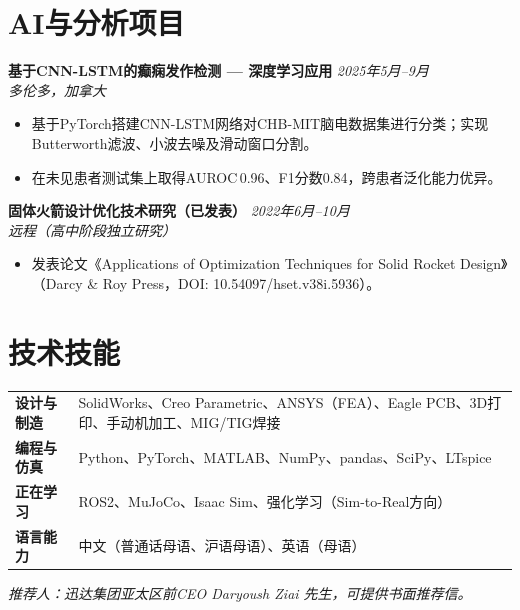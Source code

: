 \documentclass[a4paper,10pt]{article}
\newcommand{\entry}[2]{\textbf{#1} \hfill \textit{#2}}
\newcommand{\subline}[1]{\textit{\small #1}}
\begin{document}
\section{AI与分析项目}

\entry{基于CNN-LSTM的癫痫发作检测 — 深度学习应用}{2025年5月--9月}\\
\subline{多伦多，加拿大}
\begin{itemize}
  \item 基于PyTorch搭建CNN-LSTM网络对CHB-MIT脑电数据集进行分类；实现Butterworth滤波、小波去噪及滑动窗口分割。
  \item 在未见患者测试集上取得AUROC\,0.96、F1分数0.84，跨患者泛化能力优异。
\end{itemize}

\vspace{2pt}
\entry{固体火箭设计优化技术研究（已发表）}{2022年6月--10月}\\
\subline{远程（高中阶段独立研究）}
\begin{itemize}
  \item 发表论文《Applications of Optimization Techniques for Solid Rocket Design》
    （Darcy \& Roy Press，DOI: 10.54097/hset.v38i.5936）。
\end{itemize}

\section{技术技能}

\begin{tabular}{@{}p{2.4cm}p{\dimexpr\linewidth-2.4cm-2\tabcolsep\relax}}
\textbf{设计与制造} & SolidWorks、Creo Parametric、ANSYS（FEA）、Eagle PCB、3D打印、手动机加工、MIG/TIG焊接\\[2pt]
\textbf{编程与仿真} & Python、PyTorch、MATLAB、NumPy、pandas、SciPy、LTspice\\[2pt]
\textbf{正在学习}   & ROS2、MuJoCo、Isaac Sim、强化学习（Sim-to-Real方向）\\[2pt]
\textbf{语言能力}   & 中文（普通话母语、沪语母语）、英语（母语）
\end{tabular}

\vspace{5pt}
{\small\itshape 推荐人：迅达集团亚太区前CEO Daryoush Ziai 先生，可提供书面推荐信。}
\end{document}
